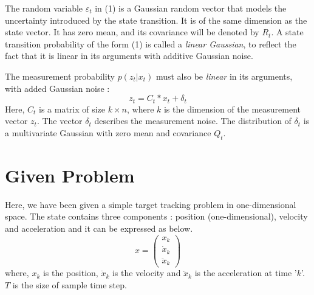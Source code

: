 \documentclass[a4paper,12pt]{extarticle}
\theoremstyle{mytheor}
\begin{document}
The random variable $\varepsilon_t$ in (1) is a Gaussian random vector that models the uncertainty introduced by the state transition. It is of the same dimension as the state vector. It has zero mean, and its covariance will be denoted by $R_t$. A state transition probability of the form (1) is called a \emph{linear Gaussian}, to reflect the fact that it is linear in its arguments with additive Gaussian noise. 

The measurement probability $ p(z_t | x_t ) $ must also be \emph{linear} in its arguments, with added Gaussian noise :
\begin{equation}
z_t = C_t * x_t + \delta_t
\end{equation}
Here, $C_t$ is a matrix of size $k \times n$, where $k$ is the dimension of the measurement vector $z_t$. The vector $\delta_t$ describes the measurement noise. The distribution of $\delta_t$ is a multivariate Gaussian with zero mean and covariance $Q_t$.


\vfill

\section*{ Given Problem }

Here, we have been given a simple target tracking problem in one-dimensional space. The state contains three components : position (one-dimensional), velocity and acceleration and it can be expressed as below.
\begin{equation}
x = \left( \begin{array}{c} x_k \\ \dot{x}_k \\ \ddot{x}_k \end{array} \right)
\end{equation}
where, $x_k$ is the position, $\dot{x}_k$ is the velocity and $\ddot{x}_k$ is the acceleration at time '$k$'. $T$ is the size of sample time step.
\end{document}
